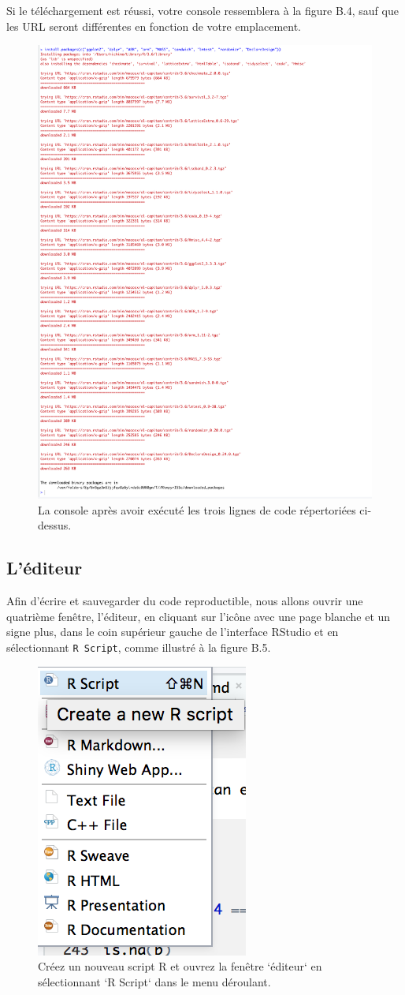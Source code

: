 \documentclass[
  12pt,
]{book}
\begin{document}
Si le téléchargement est réussi, votre console ressemblera à la figure B.4, sauf que les URL seront différentes en fonction de votre emplacement.

\begin{figure}
\includegraphics[width=0.4\linewidth]{Images/console2a} \caption{La console après avoir exécuté les trois lignes de code répertoriées ci-dessus.}\label{fig:console2}
\end{figure}

\hypertarget{luxe9diteur}{%
\subsection{L'éditeur}\label{luxe9diteur}}

Afin d'écrire et sauvegarder du code reproductible, nous allons ouvrir une quatrième fenêtre, l'éditeur, en cliquant sur l'icône avec une page blanche et un signe plus, dans le coin supérieur gauche de l'interface RStudio et en sélectionnant \texttt{R\ Script}, comme illustré à la figure B.5.

\begin{figure}
\includegraphics[width=0.6\linewidth]{Images/new_script} \caption{Créez un nouveau script R et ouvrez la fenêtre `éditeur` en sélectionnant `R Script` dans le menu déroulant.}\label{fig:newscript}
\end{figure}
\end{document}
